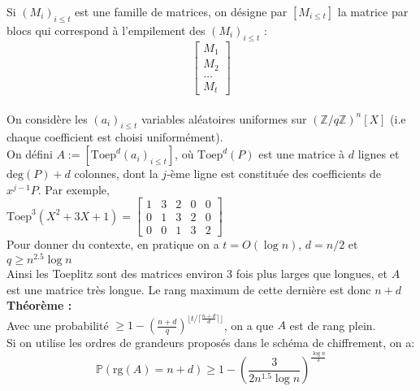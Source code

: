 \documentclass[11pt,a4paper]{article}
\begin{document}
Si $(M_i)_{i \leq t}$ est une famille de matrices, on désigne par $[M_{i\leq t}]$ la matrice par blocs qui correspond à l'empilement des  $(M_i)_{i \leq t}$ : 
$$ \left[\begin{array}{c}
M_1 \\ M_2 \\ \dots \\ M_t
\end{array}\right] $$
 \\

On considère les $(a_i)_{i \leq t}$ variables aléatoires uniformes sur $(\mathbb{Z}/q\mathbb{Z})^n[X]$ (i.e chaque coefficient est choisi uniformément). \\

On défini $A:=[\text{Toep}^{d}(a_i)_{i\leq t}]$, où  $\text{Toep}^{d}(P)$ est une matrice à $d$ lignes et $\text{deg}(P)+d$ colonnes, dont la $j$-ème ligne est constituée des coefficients de $x^{j-1}P$. Par exemple, \\

$\text{Toep}^{3}(X^2 + 3X + 1) = \left[\begin{array}{ccccc}
1&3&2&0&0 \\
0&1&3&2&0 \\ 
0&0&1&3&2 
\end{array}\right]$ \\

Pour donner du contexte, en pratique on a $t=O(\log{n})$, $d=n/2$ et $q \geq n^{2.5}\log{n}$ \\
Ainsi les Toeplitz sont des matrices environ 3 fois plus larges que longues, et $A$ est une matrice très longue. Le rang maximum de cette dernière est donc $n+d$ \\


\textbf{Théorème : \\}
Avec une probabilité $\geq 1 - (\frac{n+d}{q})^{\lfloor t/\lceil\frac{n+d}{d}\rceil\rfloor}$, on a que $A$ est de rang plein. \\
Si on utilise les ordres de grandeurs proposés dans le schéma de chiffrement, on a:  \[\mathbb{P}(\text{rg}(A)=n+d) \geq 1 - (\frac{3}{2 n^{1.5}\log{n}})^{\frac{\log{n}}{3}}\] \\
\end{document}
